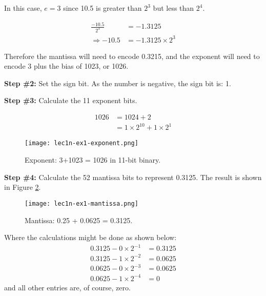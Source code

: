 \vspace{0.1cm} 

\noindent In this case, $e=3$ since 10.5 is greater than $2^3$ but less than $2^4$.  

\begin{align*}
\frac{-10.5}{2^3} & = -1.3125 \\
\Rightarrow -10.5 &= -1.3125 \times 2^3
\end{align*}

\noindent Therefore the mantissa will need to encode 0.3215, and the exponent will need to encode 3 plus the bias of 1023, or 1026.

\vspace{0.25cm}

\noindent\textbf{Step \#2:} Set the sign bit. As the number is negative, the sign bit is: 1.

\vspace{0.25cm}


\noindent\textbf{Step \#3:} Calculate the 11 exponent bits.  

\begin{align*}
1026 &= 1024 + 2 \\
&= 1 \times 2^{10} + 1 \times 2^{1}
\end{align*}


\begin{figure}
\texttt{[image: lec1n-ex1-exponent.png]}
\caption{Exponent: 3+1023 = 1026 in 11-bit binary.}
\label{fig:lec1n-ex1-exponent}
\end{figure}   
  

\vspace{0.25cm}

\noindent\textbf{Step \#4:} Calculate the 52 mantissa bits to represent 0.3125.  The result is shown in Figure \ref{fig:lec1n-ex1-mantissa}.

\begin{figure}
\texttt{[image: lec1n-ex1-mantissa.png]}
\caption{Mantissa: 0.25 + 0.0625 = 0.3125.}
\label{fig:lec1n-ex1-mantissa}
\end{figure}

\noindent Where the calculations might be done as shown below:
\begin{align*}
0.3125 - 0 \times 2^{-1} &= 0.3125 \\
0.3125 - 1 \times 2^{-2} &= 0.0625 \\
0.0625 - 0 \times 2^{-3} &= 0.0625 \\
0.0625 - 1 \times 2^{-4} &= 0
\end{align*}
and all other entries are, of course, zero.



